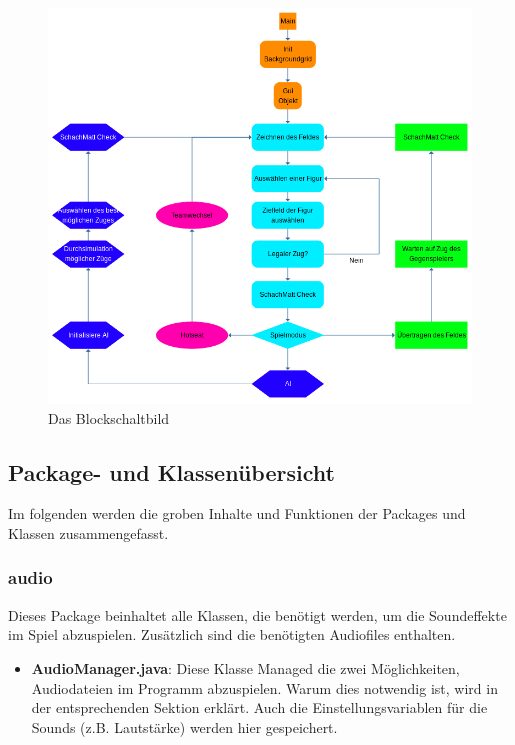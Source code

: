 \documentclass[12pt,a4paper]{article}
\begin{document}
{\begin{figure}[H]
  \centering
   	\includegraphics[width=14cm]{graphics/block.png}
  \caption{Das Blockschaltbild}
  \label{fig:block}
\end{figure}

\subsection{Package- und Klassenübersicht}
\label{SUBSEC:PACKAGE}

Im folgenden werden die groben Inhalte und Funktionen der Packages und Klassen zusammengefasst.\

\subsubsection{audio}

Dieses Package beinhaltet alle Klassen, die benötigt werden, um die Soundeffekte im Spiel abzuspielen. Zusätzlich sind die benötigten Audiofiles enthalten.\

\begin{itemize}
	\item{\textbf{AudioManager.java}: Diese Klasse Managed die zwei Möglichkeiten, Audiodateien im Programm abzuspielen. Warum dies notwendig ist, wird in der entsprechenden Sektion erklärt. %
Auch die Einstellungsvariablen für die Sounds (z.B. Lautstärke) werden hier gespeichert. }
	

\end{itemize}}
\end{document}
